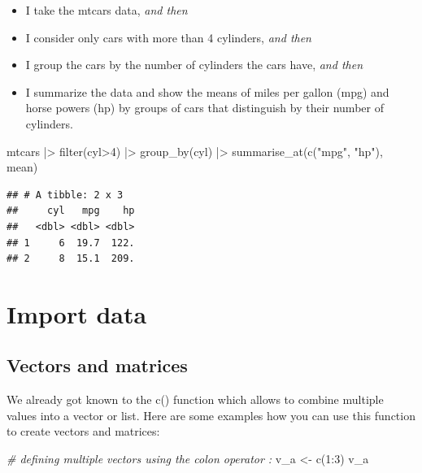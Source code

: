 \documentclass[
  12pt,
  oneside]{book}
\newenvironment{Shaded}{\begin{snugshade}}{\end{snugshade}}
\newcommand{\CommentTok}[1]{\textcolor[rgb]{0.56,0.35,0.01}{\textit{#1}}}
\newcommand{\DecValTok}[1]{\textcolor[rgb]{0.00,0.00,0.81}{#1}}
\newcommand{\FunctionTok}[1]{\textcolor[rgb]{0.00,0.00,0.00}{#1}}
\newcommand{\NormalTok}[1]{#1}
\newcommand{\OtherTok}[1]{\textcolor[rgb]{0.56,0.35,0.01}{#1}}
\newcommand{\SpecialCharTok}[1]{\textcolor[rgb]{0.00,0.00,0.00}{#1}}
\newcommand{\StringTok}[1]{\textcolor[rgb]{0.31,0.60,0.02}{#1}}
\providecommand{\tightlist}{%
  \setlength{\itemsep}{0pt}\setlength{\parskip}{0pt}}
\theoremstyle{definition}
\theoremstyle{definition}
\theoremstyle{definition}
\theoremstyle{definition}
\theoremstyle{remark}
\begin{document}
\begin{itemize}
\tightlist
\item
  I take the mtcars data, \emph{and then}
\item
  I consider only cars with more than 4 cylinders, \emph{and then}
\item
  I group the cars by the number of cylinders the cars have, \emph{and then}
\item
  I summarize the data and show the means of miles per gallon (mpg) and horse powers (hp) by groups of cars that distinguish by their number of cylinders.
\end{itemize}

\begin{Shaded}
\begin{Highlighting}[]
\NormalTok{mtcars }\SpecialCharTok{|\textgreater{}} 
  \FunctionTok{filter}\NormalTok{(cyl}\SpecialCharTok{\textgreater{}}\DecValTok{4}\NormalTok{) }\SpecialCharTok{|\textgreater{}} 
  \FunctionTok{group\_by}\NormalTok{(cyl) }\SpecialCharTok{|\textgreater{}} 
  \FunctionTok{summarise\_at}\NormalTok{(}\FunctionTok{c}\NormalTok{(}\StringTok{"mpg"}\NormalTok{, }\StringTok{"hp"}\NormalTok{), mean)}
\end{Highlighting}
\end{Shaded}

\begin{verbatim}
## # A tibble: 2 x 3
##     cyl   mpg    hp
##   <dbl> <dbl> <dbl>
## 1     6  19.7  122.
## 2     8  15.1  209.
\end{verbatim}

\hypertarget{import-data}{%
\section{Import data}\label{import-data}}

\hypertarget{vectors-and-matrices}{%
\subsection{Vectors and matrices}\label{vectors-and-matrices}}

We already got known to the c() function which allows to combine multiple values into a vector or list. Here are some examples how you can use this function to create vectors and matrices:

\begin{Shaded}
\begin{Highlighting}[]
\CommentTok{\# defining multiple vectors using the colon operator \textasciigrave{}:\textasciigrave{}}
\NormalTok{v\_a }\OtherTok{\textless{}{-}} \FunctionTok{c}\NormalTok{(}\DecValTok{1}\SpecialCharTok{:}\DecValTok{3}\NormalTok{)}
\NormalTok{v\_a}
\end{Highlighting}
\end{Shaded}
\end{document}
